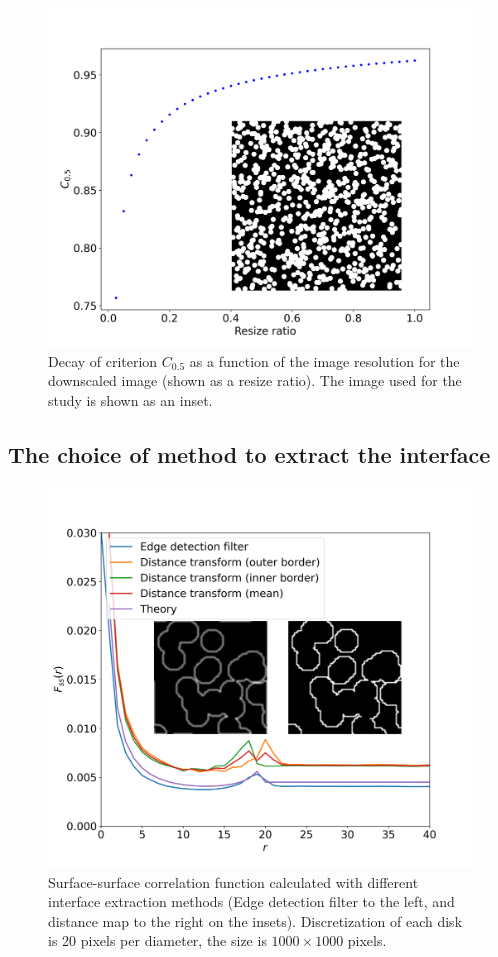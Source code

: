 \documentclass[reprint,amsmath,amssymb,aps,pre,showkeys,showpacs]{revtex4-1}
\begin{document}
\begin{figure}[ht]
  \centering
  \includegraphics[width=\linewidth]{images/plot-criterion1.png}
  \caption[]{Decay of criterion $C_{0.5}$ as a function of the image resolution
    for the downscaled image (shown as a resize ratio). The image used for the
    study is shown as an inset.}
  \label{fig:crit-plot}
\end{figure}

\subsection{The choice of method to extract the interface}
\begin{figure}[ht]
  \centering
  \includegraphics[width=\linewidth]{images/dm_sobel.png}
  \caption{Surface-surface correlation function calculated with different
    interface extraction methods (Edge detection filter to the left, and
    distance map to the right on the insets). Discretization of each disk is 20
    pixels per diameter, the size is $1000 \times 1000$ pixels.}
  \label{fig:interface-extraction}
\end{figure}
\end{document}
